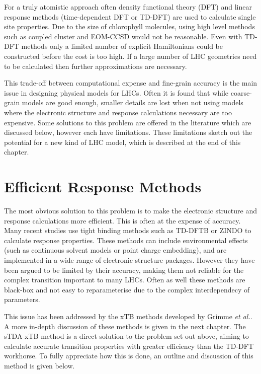 For a truly atomistic approach often density functional theory (DFT) and linear 
response methods (time-dependent DFT or TD-DFT) are used to calculate single site
properties. Due to the size of chlorophyll molecules, using high level methods such 
as coupled cluster and EOM-CCSD would not be reasonable. Even with TD-DFT methods
only a limited number of explicit Hamiltonians could be constructed before the cost 
is too high. If a large number of LHC geometries need to be calculated then further
approximations are necessary.

This trade-off between computational expense and fine-grain accuracy is the main
issue in designing physical models for LHCs. Often it is found that while coarse-
grain models are good enough, smaller details are lost when not using models where
the electronic structure and response calculations necessary are too expensive. 
Some solutions to this problem are offered in the literature which are discussed
below, however each have limitations. These limitations sketch out the potential
for a new kind of LHC model, which is described at the end of this chapter.

\section{Efficient Response Methods}
\label{sec:efficient_response_methods}

The most obvious solution to this problem is to make the electronic structure and
response calculations more efficient. This is often at the expense of accuracy.
Many recent studies use tight binding methods such as TD-DFTB or ZINDO to calculate
response properties. These methods can include environmental effects (such as continuous
solvent models or point charge embedding), and are implemented in a wide range of
electronic structure packages. However they have been argued to be limited by their
accuracy, making them not reliable for the complex \Qy transition important to many
LHCs. Often as well these methods are black-box and not easy to reparameterise due
to the complex interdependecy of parameters. 

This issue has been addressed by the xTB methods developed by Grimme \emph{et al.}.
A more in-depth discussion of these methods is given in the next chapter. The sTDA-xTB
method is a direct solution to the problem set out above, aiming to calculate accurate
transition properties with greater efficiency than the TD-DFT workhorse. To fully
appreciate how this is done, an outline and discussion of this method is given below.


